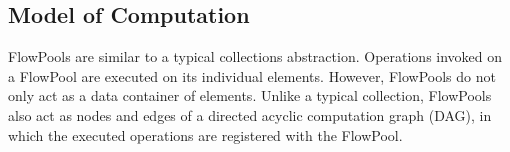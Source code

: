 









\vspace{-0.4cm}
\subsection{Model of Computation}

FlowPools are similar to a typical collections abstraction.
Operations invoked on a FlowPool are executed on its individual
elements. However, FlowPools do not only act as a data container of
elements. Unlike a typical collection, FlowPools also act as nodes and edges
of a directed acyclic computation graph (DAG), in which the executed operations
are registered with the FlowPool.

